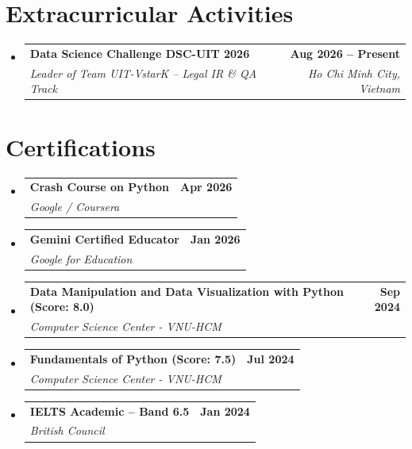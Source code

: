 \documentclass[letterpaper,11pt]{article}
\makeatletter
\newcommand{\resumeEduHeading}[4]{
  \vspace{-2pt}\item
    \begin{tabular*}{1.0\textwidth}[t]{l@{\extracolsep{\fill}}r}
      \textbf{#1} & \textbf{#2} \\
      \textit{\small#3} & \textit{\small #4} \\
    \end{tabular*}\vspace{-7pt}
}
\newcommand{\resumeCertHeading}[3]{
    \item
    \begin{tabular*}{1.0\textwidth}{l@{\extracolsep{\fill}}r}
      \textbf{#1} & \textbf{#2} \\
      \textit{\small#3} & \\
    \end{tabular*}\vspace{-7pt}
}
\newcommand{\resumeSubHeadingListStart}{\begin{itemize}[leftmargin=0.0in, label={}]}
\newcommand{\resumeSubHeadingListEnd}{\end{itemize}}
\makeatother
\begin{document}
\section{Extracurricular Activities}
  \resumeSubHeadingListStart
    \resumeEduHeading
      {Data Science Challenge DSC-UIT 2026 }{Aug 2026 -- Present}
      {Leader of Team UIT-VstarK -- Legal IR \& QA Track}{Ho Chi Minh City, Vietnam}
  \resumeSubHeadingListEnd

\section{Certifications}
  \resumeSubHeadingListStart
    \resumeCertHeading
        {Crash Course on Python}{Apr 2026}
        {Google / Coursera}
    \resumeCertHeading
        {Gemini Certified Educator}{Jan 2026}
        {Google for Education}
    \resumeCertHeading
        {Data Manipulation and Data Visualization with Python (Score: 8.0)}{Sep 2024}
        {Computer Science Center - VNU-HCM}
    \resumeCertHeading
        {Fundamentals of Python (Score: 7.5)}{Jul 2024}
        {Computer Science Center - VNU-HCM}
    \resumeCertHeading
        {IELTS Academic -- Band 6.5}{Jan 2024}
        {British Council}
  \resumeSubHeadingListEnd
\end{document}
